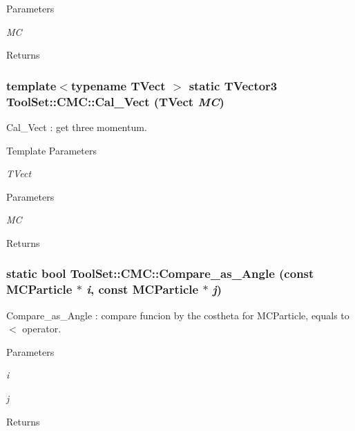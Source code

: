 \begin{DoxyParams}{Parameters}
\item[{\em MC}]\end{DoxyParams}
\begin{DoxyReturn}{Returns}

\end{DoxyReturn}
\hypertarget{classToolSet_1_1CMC_a679d9af4f1004560f178ed10f1a3028c}{
\subsubsection[{Cal\_\-Vect}]{\setlength{\rightskip}{0pt plus 5cm}template$<$typename TVect $>$ static TVector3 ToolSet::CMC::Cal\_\-Vect (TVect {\em MC})}}
\label{classToolSet_1_1CMC_a679d9af4f1004560f178ed10f1a3028c}


Cal\_\-Vect : get three momentum. 
\begin{DoxyTemplParams}{Template Parameters}
\item[{\em TVect}]\end{DoxyTemplParams}

\begin{DoxyParams}{Parameters}
\item[{\em MC}]\end{DoxyParams}
\begin{DoxyReturn}{Returns}

\end{DoxyReturn}
\hypertarget{classToolSet_1_1CMC_a4043b9e78a5178c2d8fba7f6543a7e65}{
\subsubsection[{Compare\_\-as\_\-Angle}]{\setlength{\rightskip}{0pt plus 5cm}static bool ToolSet::CMC::Compare\_\-as\_\-Angle (const MCParticle $\ast$ {\em i}, \/  const MCParticle $\ast$ {\em j})}}
\label{classToolSet_1_1CMC_a4043b9e78a5178c2d8fba7f6543a7e65}


Compare\_\-as\_\-Angle : compare funcion by the costheta for MCParticle, equals to $<$ operator. 
\begin{DoxyParams}{Parameters}
\item[{\em i}]\item[{\em j}]\end{DoxyParams}
\begin{DoxyReturn}{Returns}

\end{DoxyReturn}


